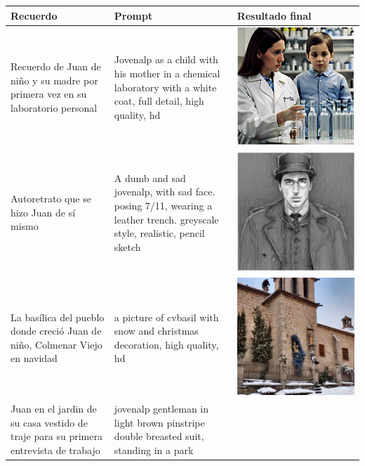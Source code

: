  \begin{table}
 	\centering
 	\begin{tabular}{>{\centering\arraybackslash}m{5cm} >{\arraybackslash}m{5cm}>{\arraybackslash}m{5cm}}
 		\textbf{Recuerdo} & \textbf{Prompt} & \textbf{Resultado final} \\
 		\hline
 		Recuerdo de Juan de niño y su madre por primera vez en su laboratorio personal & Jovenalp as a child with his mother in a chemical laboratory with a white coat, full detail, high quality, hd & \includegraphics[width = 0.3
 		\textwidth]{Imagenes/Vectorial/alpysumadrelab.png}\\
 		\hline
 		Autoretrato que se hizo Juan de sí mismo &A dumb and sad jovenalp, with sad face. posing 7/11, wearing a leather trench. greyscale style, realistic, pencil sketch & \includegraphics[width = 0.3
 		\textwidth]{Imagenes/Vectorial/autoretratoalp.png}\\
 		\hline
 		La basílica del pueblo donde creció Juan de niño, Colmenar Viejo en navidad & a picture of cvbasil with snow and christmas decoration, high quality, hd & \includegraphics[width = 0.3
 		\textwidth]{Imagenes/Vectorial/colmewinter.png}\\
 		\hline
 		Juan en el jardin de su casa vestido de traje para su primera entrevista de trabajo & jovenalp gentleman in light brown pinstripe double breasted suit, standing in a park & \includegraphics[width = 0.3

\end{tabular}
\end{table}
